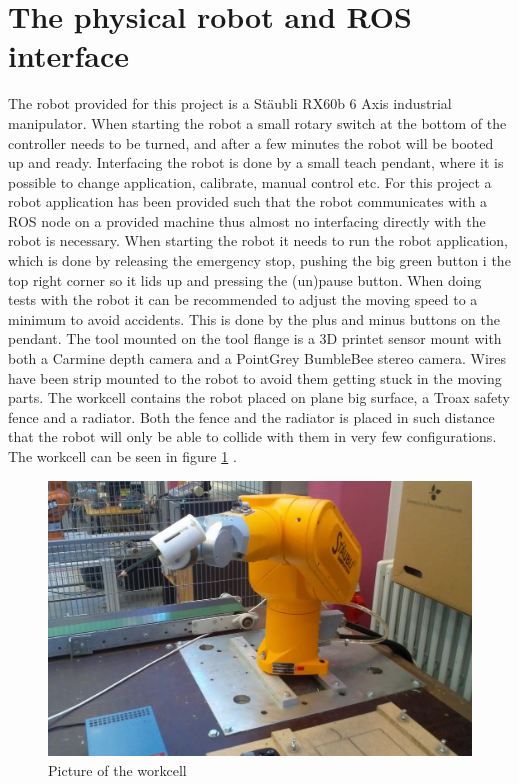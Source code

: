 

\section{The physical robot and ROS interface}
\label{sec:robot_physical}
The robot provided for this project is a Stäubli RX60b 6 Axis industrial manipulator. When starting the robot a small rotary switch at the bottom of the controller needs to be turned, and after a few minutes the robot will be booted up and ready. Interfacing the robot is done by a small teach pendant, where it is possible to change application, calibrate, manual control etc. For this project a robot application has been provided such that the robot communicates with a ROS node on a provided machine thus almost no interfacing directly with the robot is necessary. When starting the robot it needs to run the robot application, which is done by releasing the emergency stop, pushing the big green button i the top right corner so it lids up and pressing the (un)pause button. When doing tests with the robot it can be recommended to adjust the moving speed to a minimum to avoid accidents. This is done by the plus and minus buttons on the pendant.
The tool mounted on the tool flange is a 3D printet sensor mount with both a Carmine depth camera and a PointGrey BumbleBee stereo camera. Wires have been strip mounted to the robot to avoid them getting stuck in the moving parts. 
The workcell contains the robot placed on plane big surface, a Troax safety fence and a radiator. Both the fence and the radiator is placed in such distance that the robot will only be able to collide with them in very few configurations. The workcell can be seen in figure \ref{fig:workcell} .

\begin{figure}[htb]
	\begin{center}
		\includegraphics[scale=0.4,trim=0 0 0 0]{graphics/05_robotics/workcell.png}%
		\caption{Picture of the workcell}
		\label{fig:workcell}
	\end{center}
\end{figure}


